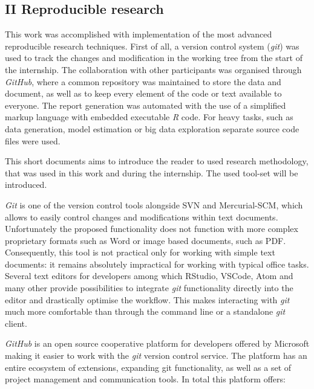 \documentclass[11pt,]{article}
\begin{document}
\newpage

\hypertarget{ii-reproducible-research}{%
\subsection*{II Reproducible research}\label{ii-reproducible-research}}

This work was accomplished with implementation of the most advanced
reproducible research techniques. First of all, a version control system
(\emph{git}) was used to track the changes and modification in the
working tree from the start of the internship. The collaboration with
other participants was organised through \emph{GitHub}, where a common
repository was maintained to store the data and document, as well as to
keep every element of the code or text available to everyone. The report
generation was automated with the use of a simplified markup language
with embedded executable \emph{R} code. For heavy tasks, such as data
generation, model estimation or big data exploration separate source
code files were used.

This short documents aims to introduce the reader to used research
methodology, that was used in this work and during the internship. The
used tool-set will be introduced.

\emph{Git} is one of the version control tools alongside SVN and
Mercurial-SCM, which allows to easily control changes and modifications
within text documents. Unfortunately the proposed functionality does not
function with more complex proprietary formats such as Word or image
based documents, such as PDF. Consequently, this tool is not practical
only for working with simple text documents: it remains absolutely
impractical for working with typical office tasks. Several text editors
for developers among which RStudio, VSCode, Atom and many other provide
possibilities to integrate \emph{git} functionality directly into the
editor and drastically optimise the workflow. This makes interacting
with \emph{git} much more comfortable than through the command line or a
standalone \emph{git} client.

\emph{GitHub} is an open source cooperative platform for developers
offered by Microsoft making it easier to work with the \emph{git}
version control service. The platform has an entire ecosystem of
extensions, expanding git functionality, as well as a set of project
management and communication tools. In total this platform offers:
\end{document}
